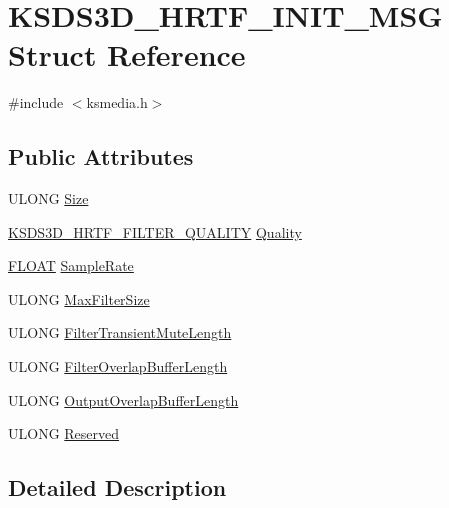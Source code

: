 \hypertarget{struct_k_s_d_s3_d___h_r_t_f___i_n_i_t___m_s_g}{}\section{K\+S\+D\+S3\+D\+\_\+\+H\+R\+T\+F\+\_\+\+I\+N\+I\+T\+\_\+\+M\+SG Struct Reference}
\label{struct_k_s_d_s3_d___h_r_t_f___i_n_i_t___m_s_g}


{\ttfamily \#include $<$ksmedia.\+h$>$}

\subsection*{Public Attributes}
\begin{DoxyCompactItemize}
\item 
U\+L\+O\+NG \hyperlink{struct_k_s_d_s3_d___h_r_t_f___i_n_i_t___m_s_g_a2e2da9900c23c8b9d07a68b177d4ea93}{Size}
\item 
\hyperlink{ksmedia_8h_a4de026415783288ca6df9a57edc19aaa}{K\+S\+D\+S3\+D\+\_\+\+H\+R\+T\+F\+\_\+\+F\+I\+L\+T\+E\+R\+\_\+\+Q\+U\+A\+L\+I\+TY} \hyperlink{struct_k_s_d_s3_d___h_r_t_f___i_n_i_t___m_s_g_a84395acb281055eb3d0fa168051219e1}{Quality}
\item 
\hyperlink{twolame_2libtwolame_2common_8h_ae8690abbffa85934d64d545920e2b108}{F\+L\+O\+AT} \hyperlink{struct_k_s_d_s3_d___h_r_t_f___i_n_i_t___m_s_g_a52460280f0bacc2b6baed5bf84a07ec5}{Sample\+Rate}
\item 
U\+L\+O\+NG \hyperlink{struct_k_s_d_s3_d___h_r_t_f___i_n_i_t___m_s_g_a644714c2b02710ce60af4956d9bfaa01}{Max\+Filter\+Size}
\item 
U\+L\+O\+NG \hyperlink{struct_k_s_d_s3_d___h_r_t_f___i_n_i_t___m_s_g_a15c037649be521fe02922ddc34747df8}{Filter\+Transient\+Mute\+Length}
\item 
U\+L\+O\+NG \hyperlink{struct_k_s_d_s3_d___h_r_t_f___i_n_i_t___m_s_g_af8b818884c426d81019a1aeb26344ede}{Filter\+Overlap\+Buffer\+Length}
\item 
U\+L\+O\+NG \hyperlink{struct_k_s_d_s3_d___h_r_t_f___i_n_i_t___m_s_g_a8cf1866efee88e1eeece8c179d756676}{Output\+Overlap\+Buffer\+Length}
\item 
U\+L\+O\+NG \hyperlink{struct_k_s_d_s3_d___h_r_t_f___i_n_i_t___m_s_g_a62c8718b68d66577b8f01f64d983cb24}{Reserved}
\end{DoxyCompactItemize}


\subsection{Detailed Description}


